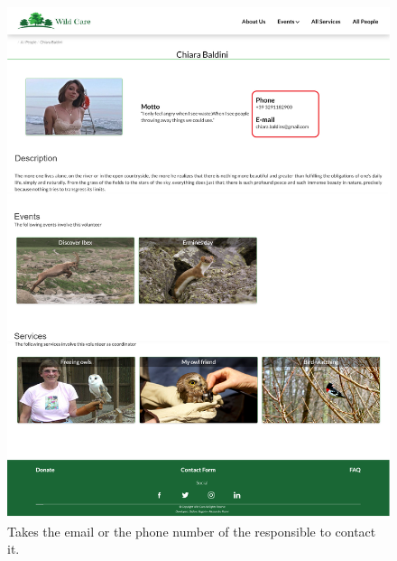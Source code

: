 	\begin{figure}[h!]
		\centering
		\begin{minipage}[b]{1\textwidth}
    			\includegraphics[width=\textwidth]{./assets/mockups/persondetails_contacts.png}
			\caption{Takes the email or the phone number of the responsible to contact it.}
		\end{minipage}
	\end{figure}